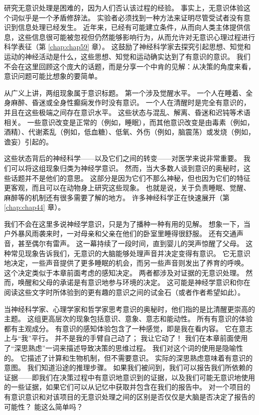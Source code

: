 研究无意识处理是困难的，因为人们否认该过程的经验。 事实上，无意识体验这个词似乎是一个矛盾修辞法。 实验者必须找到一种方法来证明尽管受试者没有意识到信息处理已经发生。 近年来，已经有可能建立条件，从而向人类主体提供信息，这些信息很可能被忽视但仍然能够影响行为，从而允许对无意识心理过程进行科学表征（第 \ref{chap:chap59} 章）。 这鼓励了神经科学家去探究引起思想、知觉和运动的神经活动是什么，这些思想、知觉和运动确实达到了有意识的意识。 我们不会在这里回顾这个庞大的话题，而是分享一个中肯的见解：从决策的角度来看，意识问题可能比想象的要简单。

从广义上讲，两组现象属于意识标题。 第一个涉及觉醒水平。 一个人在睡着、全身麻醉、昏迷或全身性癫痫发作时没有意识。 一个人在清醒时是完全有意识的，并且在这些极端之间存在意识水平。 这些状态与混乱、解离、昏迷和迟钝等术语相关。 一些意识改变是正常的（例如，睡眠），而其他意识改变是由毒素（例如，酒精）、代谢紊乱（例如，低血糖）、低氧、外伤（例如，脑震荡）或发烧（例如，谵妄）引起的。

这些状态背后的神经科学——以及它们之间的转变——对医学来说非常重要。 我们可以将这组现象归类为神经学意识。 然而，当大多数人谈到意识的奥秘时，这些话题并不是他们的意思。 这部分是因为它们不那么神秘，但也因为它们的特征更客观，而且可以在动物身上研究这些现象。 也就是说，关于负责睡眠、觉醒、麻醉等的机制还有很多需要了解的地方。 许多神经科学正在快速展开（第 \ref{chap:chap44} 章）。

我们不会在这里多说神经学意识，只是为了播种一种有用的见解。 想象一下，当户外暴风雨袭来时，一对母亲和父亲在他们的卧室里睡得很舒服。 还有交通声音，甚至偶尔有雷声。 这一幕持续了一段时间，直到婴儿的哭声惊醒了父母。 这种常见现象告诉我们，无意识的大脑能够处理声音并决定变得有意识。 它无意识地决定，一些声音提供了更多睡眠的机会，而另一些声音则发出了养育的呼唤。 这个决定类似于本章前面考虑的感知决定。 两者都涉及对证据的无意识处理。 然而，唤醒和父母的承诺是有意识地参与环境的决定。 这可能是神经学意识和你在阅读这些文字时所体验到的更有趣的意识之间的试金石（或者作者希望如此）。

当神经科学家、心理学家和哲学家思考意识的奥秘时，他们指的是比清醒更崇高的主题。 这组更高层次的现象包括意识、意象、意志和能动性。 所有有意识的体验都有主观成分。 有意识的感知体验包含了一种感觉，即是我在看内容。 它在意志上与“我”平行。 并不是我的手臂自己动了； 我让它动了！ 我们在本章前面使用了“深思熟虑”一词来描述导致决策的思维过程。 我们对这个词的使用是隐喻性的。 它描述了计算和生物机制，但不需要意识。 实际的深思熟虑意味着有意识的意图。 我们知道沿途的推理步骤。 如果我们被问到，我们可以报告我们所依赖的证据——即我们在决策过程中有意识地意识到的证据，以及我们可能无意识地使用的一些证据，如果它们可以从记忆中获取并包含在我们的报告中。 对一个项目的有意识意识和对该项目的无意识处理之间的区别是否仅仅是大脑是否决定了报告的可能性？ 能这么简单吗？

